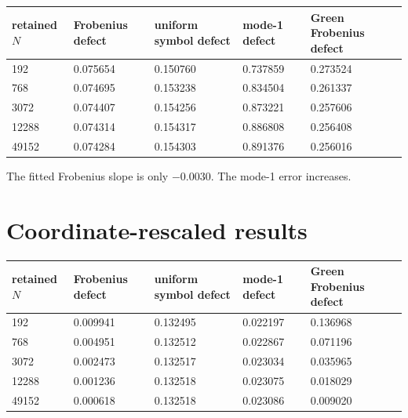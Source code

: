 \documentclass[11pt,a4paper,openany]{report}
\begin{document}
\begin{center}
\begingroup\footnotesize
\setlength{\tabcolsep}{3.5pt}
\renewcommand{\arraystretch}{1.16}
\begin{longtable}{@{}p{}p{}p{}p{}p{}@{}}
\toprule
\textbf{retained \(N\)} & \textbf{Frobenius defect} & \textbf{uniform symbol defect} & \textbf{mode-1 defect} & \textbf{Green Frobenius defect} \\
\midrule
\endhead
192 & 0.075654 & 0.150760 & 0.737859 & 0.273524 \\
768 & 0.074695 & 0.153238 & 0.834504 & 0.261337 \\
3072 & 0.074407 & 0.154256 & 0.873221 & 0.257606 \\
12288 & 0.074314 & 0.154317 & 0.886808 & 0.256408 \\
49152 & 0.074284 & 0.154303 & 0.891376 & 0.256016 \\
\bottomrule
\end{longtable}
\endgroup
\end{center}

The fitted Frobenius slope is only \(-0.0030\). The mode-1 error increases.

\section{Coordinate-rescaled results}

\begin{center}
\begingroup\footnotesize
\setlength{\tabcolsep}{3.5pt}
\renewcommand{\arraystretch}{1.16}
\begin{longtable}{@{}p{}p{}p{}p{}p{}@{}}
\toprule
\textbf{retained \(N\)} & \textbf{Frobenius defect} & \textbf{uniform symbol defect} & \textbf{mode-1 defect} & \textbf{Green Frobenius defect} \\
\midrule
\endhead
192 & 0.009941 & 0.132495 & 0.022197 & 0.136968 \\
768 & 0.004951 & 0.132512 & 0.022867 & 0.071196 \\
3072 & 0.002473 & 0.132517 & 0.023034 & 0.035965 \\
12288 & 0.001236 & 0.132518 & 0.023075 & 0.018029 \\
49152 & 0.000618 & 0.132518 & 0.023086 & 0.009020 \\
\bottomrule
\end{longtable}
\endgroup
\end{center}
\end{document}
